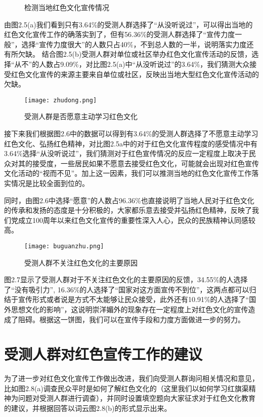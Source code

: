 \documentclass[AutoFakeBold]{LZUThesis}
\begin{document}
\begin{figure}[htbp]
    \centering
    \quad
    \caption{检测当地红色文化宣传情况}
\end{figure}

由图2.5(a)我们看到只有3.64\%的受测人群选择了“从没听说过”，可以得出当地的红色文化宣传工作的确落实到了，但有56.36\%的受测人群选择了“宣传力度一般”，选择“宣传力度很大”的人数只占40\%，不到总人数的一半，说明落实力度还有所欠缺。
结合图2.5(b)受测人群对单位或社区举办红色文化宣传活动的反馈，选择“从不”的人数占9.09\%，对比图2.5(a)中“从没听说过”的3.64\%，我们猜测大众接受红色文化宣传的来源主要来自单位或社区，反映出当地大型红色文化宣传活动的欠缺。

\begin{figure}[htbp]
    \centering
    \texttt{[image: zhudong.png]}
    \caption{受测人群是否愿意主动学习红色文化}
\end{figure}

接下来我们根据图2.6中的数据可以得到有3.64\%的受测人群选择了不愿意主动学习红色文化、弘扬红色精神，对比图2.5a中的对于红色文化宣传程度的感受情况中有3.64\%选择“从没听说过”，我们猜测对于红色宣传情况的反应一定程度上取决于民众对其的接受度，一些居民如果不愿意去接受红色文化，可能就会出现对红色宣传文化活动的“视而不见”。加上这一因素，我们可以推测当地的红色文化宣传工作落实情况是比较全面到位的。

同时，由图2.6中选择“愿意”的人数占96.36\%也直接说明了当地人民对于红色文化的传承和发扬的态度是十分积极的，大家都乐意去接受并弘扬红色精神，反映了我们党成立100周年以来红色文化宣传的重要性深入人心，民众的民族精神认同感较高。

\begin{figure}[htbp]
    \centering
    \texttt{[image: buguanzhu.png]}
    \caption{受测人群不关注红色文化的主要原因}
\end{figure}

图2.7显示了受测人群对于不关注红色文化的主要原因的反馈，34.55\%的人选择了“没有吸引力”, 16.36\%的人选择了“国家对这方面宣传不到位”，这两点都可以归结于宣传形式或者说是方式不太能够让民众接受，此外还有10.91\%的人选择了“国外思想文化的影响”，这说明崇洋媚外的现象存在一定程度上对红色文化的宣传造成了阻碍。根据这一饼图，我们可以在宣传手段和力度方面做进一步的努力。

\section{受测人群对红色宣传工作的建议}
为了进一步对红色文化宣传工作做出改进，我们向受测人群询问相关情况和意见，比如图2.8(a)调查民众平时是如何了解红色文化的（这里我们以如何学习红旗渠精神为问题对受测人群进行调查），并同时设置填空题向大家征求对于红色文化教育的建议，并根据回答以词云图2.8(b)的形式显示出来。
\end{document}
